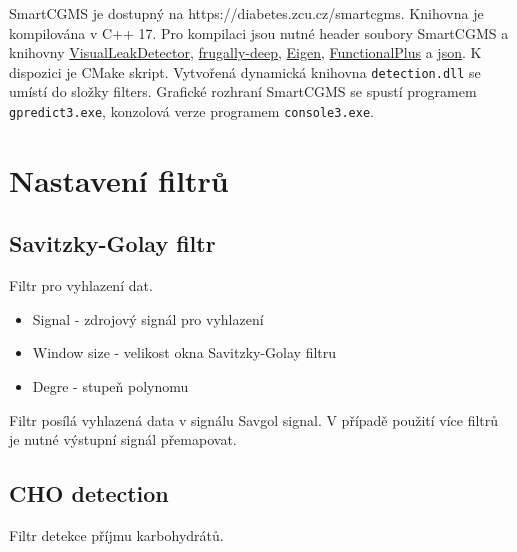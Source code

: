 SmartCGMS je dostupný na https://diabetes.zcu.cz/smartcgms. Knihovna je
kompilována v C++ 17. Pro kompilaci jsou nutné header soubory SmartCGMS
a knihovny \href{https://kinddragon.github.io/vld/}{VisualLeakDetector},
\href{https://github.com/Dobiasd/frugally-deep}{frugally-deep},
\href{https://gitlab.com/libeigen/eigen}{Eigen},
\href{https://github.com/Dobiasd/FunctionalPlus}{FunctionalPlus} a
\href{https://github.com/nlohmann/json}{json}. K dispozici je CMake
skript. Vytvořená dynamická knihovna \texttt{detection.dll} se umístí do
složky filters. Grafické rozhraní SmartCGMS se spustí programem
\texttt{gpredict3.exe}, konzolová verze programem \texttt{console3.exe}.

\section*{Nastavení filtrů}

\subsection*{Savitzky-Golay filtr}

Filtr pro vyhlazení dat.

\begin{itemize}
\setlength\itemsep{-1.5em}
\item Signal - zdrojový signál pro vyhlazení\\
\item Window size - velikost okna Savitzky-Golay filtru\\
\item Degre - stupeň polynomu
\end{itemize}

\noindent Filtr posílá vyhlazená data v signálu Savgol signal. V případě použití více filtrů je nutné výstupní signál přemapovat.

\subsection*{CHO detection}

Filtr detekce příjmu karbohydrátů.

